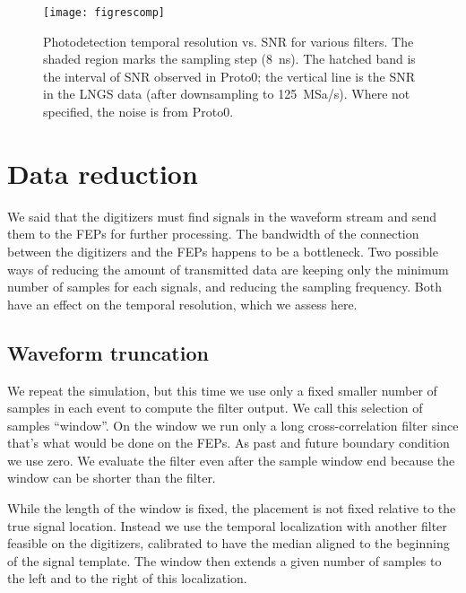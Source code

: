 
\begin{figure}
    \hspace{0.00\textwidth}
    \texttt{[image: figrescomp]}
    
    \caption{Photodetection temporal resolution vs. SNR for various filters.
    The shaded region marks the sampling step (\SI{8}{ns}). The hatched band is
    the interval of SNR observed in Proto0; the vertical line is the SNR in the
    LNGS data (after downsampling to \SI{125}{MSa/s}). Where not specified, the
    noise is from Proto0.}
    
    \label{fig:rescomp}
\end{figure}

\section{Data reduction}

We said that the digitizers must find signals in the waveform stream and send
them to the FEPs for further processing. The bandwidth of the connection
between the digitizers and the FEPs happens to be a bottleneck. Two possible
ways of reducing the amount of transmitted data are keeping only the minimum
number of samples for each signals, and reducing the sampling frequency. Both
have an effect on the temporal resolution, which we assess here.

\subsection{Waveform truncation}

We repeat the simulation, but this time we use only a fixed smaller number of
samples in each event to compute the filter output. We call this selection of
samples ``window''. On the window we run only a long cross-correlation filter
since that's what would be done on the FEPs. As past and future boundary
condition we use zero. We evaluate the filter even after the sample window end
because the window can be shorter than the filter.

While the length of the window is fixed, the placement is not fixed relative to
the true signal location. Instead we use the temporal localization with another
filter feasible on the digitizers, calibrated to have the median aligned to the
beginning of the signal template. The window then extends a given number of
samples to the left and to the right of this localization.

